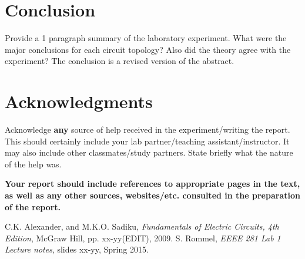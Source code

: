 \documentclass[11pt]{article}
\begin{document}
	
	\section{Conclusion}
	Provide a 1 paragraph summary of the laboratory experiment.  What were the major conclusions for each circuit topology?  Also did the theory agree with the experiment?  The conclusion is a revised version of the abstract.
	
	\section{Acknowledgments}
	Acknowledge \textbf{any} source of help received in the experiment/writing the report.  This should certainly include your lab partner/teaching assistant/instructor.  It may also include other classmates/study partners. State briefly what the nature of the help was.
	
	\textbf{Your report should include references to appropriate pages in the text, as well as any other sources, websites/etc. consulted in the preparation of the report.}
\begin{thebibliography}{9}
	C.K. Alexander, and M.K.O. Sadiku,
	\emph{Fundamentals of Electric Circuits, 4th Edition},
	McGraw Hill, pp. xx-yy(EDIT), 2009.
	S. Rommel,
	\emph{EEEE 281 Lab 1 Lecture notes},
	slides xx-yy, Spring 2015.
\end{thebibliography}
\end{document}

